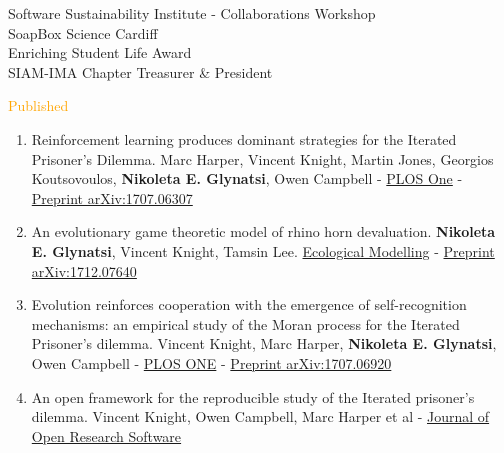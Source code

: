 \documentclass{beamer}
\begin{document}
\begin{frame}
    \begin{center}
    Software Sustainability Institute - Collaborations Workshop \vspace{.5cm} \\
    SoapBox Science Cardiff \vspace{.5cm} \\
    Enriching Student Life Award \vspace{.5cm} \\
    SIAM-IMA Chapter Treasurer \& President
    \end{center}
\end{frame}

\begin{frame}
    \footnotesize{\textcolor{orange}{Published}}
    \tiny{
    \begin{enumerate}
    \def\labelenumi{\arabic{enumi}.}
    \item
    Reinforcement learning produces dominant strategies for
    the Iterated Prisoner's Dilemma. Marc Harper, Vincent Knight, Martin
    Jones, Georgios Koutsovoulos, \textbf{Nikoleta E. Glynatsi}, Owen Campbell -
    \href{https://journals.plos.org/plosone/article?id=10.1371/journal.pone.0188046}{PLOS
    One} -
    \href{https://arxiv.org/abs/1707.06307}{Preprint arXiv:1707.06307}
    \item
    An evolutionary game theoretic model of rhino horn
    devaluation. \textbf{Nikoleta E. Glynatsi}, Vincent Knight, Tamsin Lee.
    \href{https://www.sciencedirect.com/science/article/pii/S0304380018303260}{Ecological
    Modelling} -
    \href{https://arxiv.org/abs/1712.07640}{Preprint arXiv:1712.07640}
    \item
    Evolution reinforces cooperation with the emergence of
    self-recognition mechanisms: an empirical study of the Moran process
    for the Iterated Prisoner's dilemma. Vincent Knight, Marc Harper,
    \textbf{Nikoleta E. Glynatsi}, Owen Campbell -
    \href{https://journals.plos.org/plosone/article/comments?id=10.1371/journal.pone.0204981}{PLOS
    ONE} -
    \href{https://arxiv.org/abs/1707.06920}{Preprint arXiv:1707.06920}
    \item
    An open framework for the reproducible study of the
    Iterated prisoner's dilemma. Vincent Knight, Owen Campbell, Marc
    Harper et al -
    \href{https://openresearchsoftware.metajnl.com/articles/10.5334/jors.125/}{Journal
    of Open Research Software}
    \end{enumerate}
    }
    

\end{frame}
\end{document}
